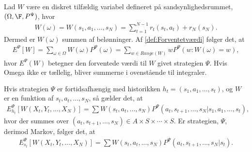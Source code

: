 Lad $W$ være en diskret tilfældig variabel defineret på sandsynlighedsrummet, $(\Omega, \F, P^{\Psi})$, hvor
\begin{align*}
    W(\omega)=W(s_1 , a_1 , \dots , s_N) = \sum_{t=1}^{N-1} r_t(s_t,a_t) + r_N(s_N).
\end{align*}
Dermed er $W(\omega)$ summen af belønninger. Af \autoref{def:Forventetværdi} følger det, at
\begin{align*}
    E^\Psi [W] = \sum_{\omega \in \Omega} W(\omega)P^\Psi\left(\omega\right) = \sum_{w \in Range(W)} w P^\Psi \left(w: W(\omega) = w\right), 
\end{align*}
hvor $E^\Psi(W)$ betegner den forventede værdi til $W$ givet strategien $\Psi$. Hvis Omega ikke er tællelig, bliver summerne i ovenstående til integraler. 

Hvis strategien $\Psi$ er fortidsafhængig med historikken $h_t=(s_1, a_1 , \dots , s_t)$, og $W$ er en funktion af $s_t, a_t,\dots, s_N$, så gælder det, at
\begin{align}\label{eq:forventet_belønning_fortidsafhængig}
    E_{h_t}^\Psi \left[W(X_t , Y_t , \dots , X_N) \right] = \sum W(s_t , a_t , \dots , s_N) P^\Psi (a_t , s_{t+1} , \dots , s_N | s_1 , a_1 , \dots , s_t),
\end{align}
hvor der summes over $(a_t , s_{t+1} , \dots , s_N) \in A \times S \times \cdots \times S$. Er strategien, $\Psi$, derimod Markov, følger det, at
\begin{align*}
     E_{s_t}^\Psi \left[W(X_t , Y_t , \dots , X_N) \right] = \sum W(s_t , a_t , \dots , s_N) P^\Psi (a_t , s_{t+1} , \dots , s_N | s_t).
\end{align*}




